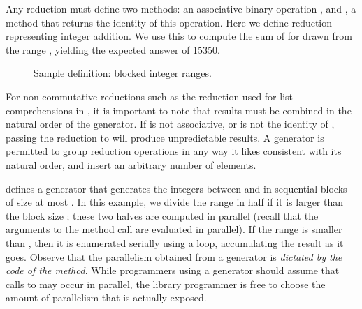 Any reduction must define two methods: an associative binary operation
, and , a method that returns the identity of
this operation.  Here we define reduction  representing integer
addition.  We use this to compute the sum of  for 
drawn from the range ,
yielding the expected answer of 15350.

\begin{figure}

\caption{Sample  definition: blocked integer ranges.}
\end{figure}

For non-commutative reductions such as the  reduction used for
list comprehensions in , it is important to
note that results must be combined in the natural order of the
generator.  If  is not associative, or  is not
the identity of , passing the reduction to 
will produce unpredictable results.  A generator is permitted to group
reduction operations in any way it likes consistent with its natural
order, and insert an arbitrary number of  elements.

 defines a generator that generates the integers
between  and  in sequential blocks of size at most
.  In this example, we divide the range in half if it is larger
than the block size ; these two halves are computed in parallel
(recall that the arguments to the method call
 are evaluated in parallel).  If the
range is smaller than , then it is enumerated serially using a
 loop, accumulating the result  as it goes.  Observe
that the parallelism obtained from a generator is \emph{dictated by
  the code of the  method}.  While programmers using a
generator should assume that calls to  may occur in
parallel, the library programmer is free to choose the amount of
parallelism that is actually exposed.

